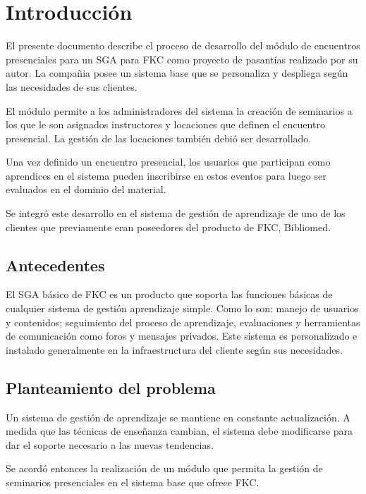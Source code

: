 \chapter*{Introducción}
\thispagestyle{empty} %
 
El presente documento describe el proceso de desarrollo del módulo de encuentros presenciales para un \gls{SGA} para \gls{FKC} como proyecto de pasantías realizado por su autor. La compañia posee un sistema base que se personaliza y despliega según las necesidades de sus clientes.

El módulo permite a los administradores del sistema la creación de seminarios a los que le son asignados instructores y locaciones que definen el encuentro presencial. La gestión de las locaciones también debió ser desarrollado.

Una vez definido un encuentro presencial, los usuarios que participan como aprendices en el sistema pueden inscribirse en estos eventos para luego ser evaluados en el dominio del material.

Se integró este desarrollo en el sistema de gestión de aprendizaje de uno de los clientes que previamente eran poseedores del producto de FKC, Bibliomed.

\section*{Antecedentes}
El \gls{SGA} básico de \gls{FKC} es un producto que soporta las funciones básicas de cualquier sistema de gestión aprendizaje simple. Como lo son: manejo de usuarios y contenidos; seguimiento del proceso de aprendizaje, evaluaciones y herramientas de comunicación como foros y mensajes privados. Este sistema es personalizado e instalado generalmente en la infraestructura del cliente según sus necesidades.

\section*{Planteamiento del problema}

Un sistema de gestión de aprendizaje se mantiene en constante actualización. A medida que las técnicas de enseñanza cambian, el sistema debe modificarse para dar el soporte necesario a las nuevas tendencias.

Se acordó entonces la realización de un módulo que permita la gestión de seminarios presenciales en el sistema base que ofrece \gls{FKC}.


